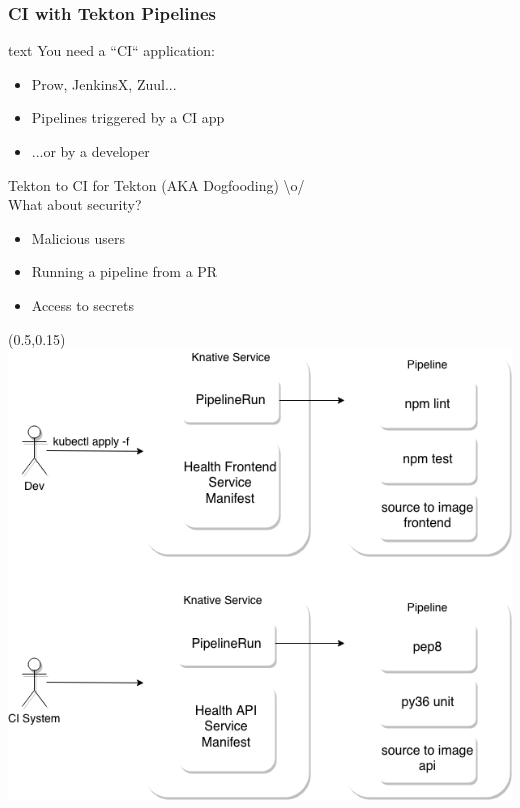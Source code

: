 \documentclass[aspectratio=169,11pt,hyperref={colorlinks=true}]{beamer}
\begin{document}
\begin{lblackrwhiteframe}
\begin{lblackrwhiteframe}
\begin{blackframe}
\begin{lblackrwhiteframe}
  \frametitle{CI with Tekton Pipelines}
  \large
  \begin{beamercolorbox}[wd=0.45\paperwidth]{text}
    You need a ``CI`` application: \\
    \begin{itemize}
      \item Prow, JenkinsX, Zuul...
      \item Pipelines triggered by a CI app
      \item ...or by a developer
    \end{itemize}
    \vspace{3ex}
    Tekton to CI for Tekton (AKA Dogfooding) \textbackslash o/ \\
    \vspace{3ex}
    What about security?
    \begin{itemize}
      \item Malicious users
      \item Running a pipeline from a PR
      \item Access to secrets
    \end{itemize}
  \end{beamercolorbox}%
  \begin{textblock*}{0.5\paperwidth}(0.5\paperwidth,0.15\paperheight)
    \centering
    \includegraphics[width=0.45\paperwidth]{img/tekton_ci.png}
  \end{textblock*}
\end{lblackrwhiteframe}


\end{blackframe}
\end{lblackrwhiteframe}
\end{lblackrwhiteframe}
\end{document}
